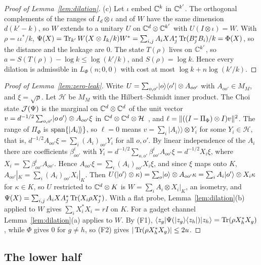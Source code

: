 \begin{proof}[Proof of Lemma~\ref{lem:dilation}]
(c) Let $\iota$ embed $\mathbb C^k$ in $\mathbb C^{k'}$. The orthogonal complements of the ranges of $I_d\otimes\iota$ and of $W$ have the same dimension $d(k'-k)$, so $W$
extends to a unitary $U$ on $\mathbb C^d\otimes\mathbb C^{k'}$ with $U(I\otimes\iota)=W$. With $\rho=\iota\iota^*/k$,
$\Psi(X)=\operatorname{Tr}_{k'}W(X\otimes I_k/k)W^*=\sum_{i,j}A_iXA_j^*\operatorname{Tr}(B_j^*B_i)/k=\Phi(X)$, so the distance and the leakage are $0$. The state $T(\rho)$ lives on
$\mathbb C^{k'}$, so $a=S(T(\rho))-\log k\le\log(k'/k)$, and $S(\rho)=\log k$. Hence every dilation is admissible in $L_\Phi(n;0,0)$ with cost at most
$\log k+n\log(k'/k)$.
\end{proof}

\begin{proof}[Proof of Lemma~\ref{lem:zero-leak}]
Write $U=\sum_{o,o'}\lvert o\rangle\langle o'\rvert\otimes A_{oo'}$ with $A_{oo'}\in M_M$, and $\xi=\sqrt\rho$. Let $\mathcal H$ be $M_M$ with the Hilbert--Schmidt inner product.
The Choi state $\mathcal J(\Psi)$ is the marginal on $\mathbb C^d\otimes\mathbb C^d$ of the unit vector $v=d^{-1/2}\sum_{o,o'}\lvert o\,o'\rangle\otimes A_{oo'}\xi$ in
$\mathbb C^d\otimes\mathbb C^d\otimes\mathcal H$~\cite[proof of Lemma~C.1]{DouglasMghirbiC}, and $\ell=\lVert ((I-\Pi_\Phi)\otimes I)v\rVert^2$. The range of $\Pi_\Phi$ is
$\operatorname{span}\{\vert A_i\rangle\!\rangle\}$, so $\ell=0$ means $v=\sum_i\vert A_i\rangle\!\rangle\otimes Y_i$ for some $Y_i\in\mathcal H$, that is,
$d^{-1/2}A_{oo'}\xi=\sum_i(A_i)_{oo'}Y_i$ for all $o,o'$. By linear independence of the $A_i$ there are coefficients $\beta^i_{oo'}$ with
$Y_i=d^{-1/2}\sum_{o,o'}\beta^i_{oo'}A_{oo'}\xi=d^{-1/2}X_i\xi$, where $X_i=\sum\beta^i_{oo'}A_{oo'}$. Hence $A_{oo'}\xi=\sum_i(A_i)_{oo'}X_i\xi$, and since $\xi$
maps onto $K$, $A_{oo'}|_K=\sum_i(A_i)_{oo'}X_i|_K$. Then $U(\lvert o'\rangle\otimes\kappa)=\sum_o\lvert o\rangle\otimes A_{oo'}\kappa=\sum_iA_i\lvert o'\rangle\otimes X_i\kappa$ for
$\kappa\in K$, so $U$ restricted to $\mathbb C^d\otimes K$ is $W=\sum_iA_i\otimes X_i|_K$, an isometry, and $\Psi(X)=\sum_{i,j}A_iXA_j^*\operatorname{Tr}(X_i\rho X_j^*)$. With a
flat probe, Lemma~\ref{lem:dilation}(b) applied to $W$ gives $\sum_iX_i^*X_i=rI$ on $K$. For a gadget channel Lemma~\ref{lem:dilation}(a) applies to $W$.
By (F1), $\langle z_g\rvert\Psi(\lvert z_g\rangle\langle z_h\rvert)\lvert z_h\rangle=\operatorname{Tr}(\rho X_h^*X_g)$, while $\Phi$ gives $0$ for $g\ne h$, so (F2) gives $|\operatorname{Tr}(\rho X_h^*X_g)|\le2u$.
\end{proof}

\subsection{The lower half}


